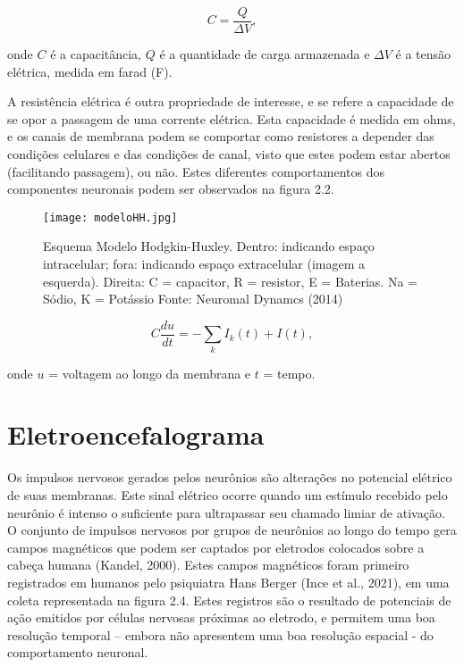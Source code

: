 \begin{equation}
    C = \frac{Q}{\Delta V},
\end{equation}

onde $C$ é a capacitância, $Q$ é a quantidade de carga armazenada e $\Delta V$ é a tensão elétrica, medida em farad (F). 


A resistência elétrica é outra propriedade de interesse, e se refere a capacidade de se opor a passagem de uma corrente elétrica. Esta capacidade é medida em ohms, e os canais de membrana podem se comportar como resistores a depender das condições celulares e das condições de canal, visto que estes podem estar abertos (facilitando passagem), ou não. Estes diferentes comportamentos dos componentes neuronais podem ser observados na figura 2.2.


\begin{figure}
    \centering
    \texttt{[image: modeloHH.jpg]}
    \caption{Esquema Modelo Hodgkin-Huxley. 
    Dentro: indicando espaço intracelular; fora: indicando espaço extracelular (imagem a esquerda). Direita: 
    C = capacitor, R = resistor, E = Baterias. Na = Sódio, K = Potássio  Fonte: Neuromal Dynamcs (2014)} 
\end{figure}

\begin{equation}
    C \frac{d u }{ d t} =  - \sum_{k} I_k (t) + I (t),
\end{equation}

onde $u$ = voltagem ao longo da membrana e $t$ = tempo. 




\section{Eletroencefalograma}

Os impulsos nervosos gerados pelos neurônios são alterações no potencial elétrico de suas membranas. 
Este sinal elétrico ocorre quando um estímulo recebido pelo neurônio é intenso o suficiente para ultrapassar seu chamado limiar de ativação.
 O conjunto de impulsos nervosos por grupos de neurônios ao longo do tempo gera campos magnéticos que podem ser captados por eletrodos 
 colocados sobre a cabeça humana (Kandel, 2000). Estes campos magnéticos foram primeiro registrados em humanos pelo psiquiatra Hans Berger 
 (Ince et al., 2021), em uma coleta representada na figura 2.4. 
 Estes registros são o resultado de potenciais de ação emitidos por células nervosas próximas ao eletrodo, 
 e permitem uma boa resolução temporal – embora não apresentem uma boa resolução espacial -  do comportamento neuronal. 



